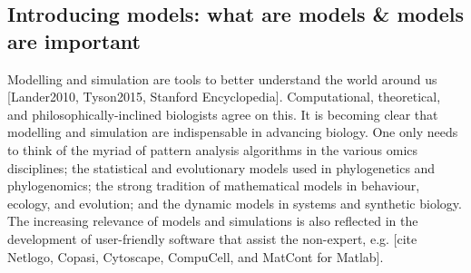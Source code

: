 \subsection{Introducing models: what are models \& models are important}

Modelling and simulation are tools to better understand the world around us [Lander2010, Tyson2015, Stanford Encyclopedia]. Computational, theoretical, and philosophically-inclined biologists agree on this.  It is becoming clear that modelling and simulation are indispensable in advancing biology. One only needs to think of the myriad of pattern analysis algorithms in the various omics disciplines; the statistical and evolutionary models used in phylogenetics and phylogenomics; the strong tradition of mathematical models in behaviour, ecology, and evolution; and the dynamic models in systems and synthetic biology. The increasing relevance of models and simulations is also reflected in the development of user-friendly software that assist the non-expert, e.g. [cite Netlogo, Copasi, Cytoscape, CompuCell, and MatCont for Matlab].

  